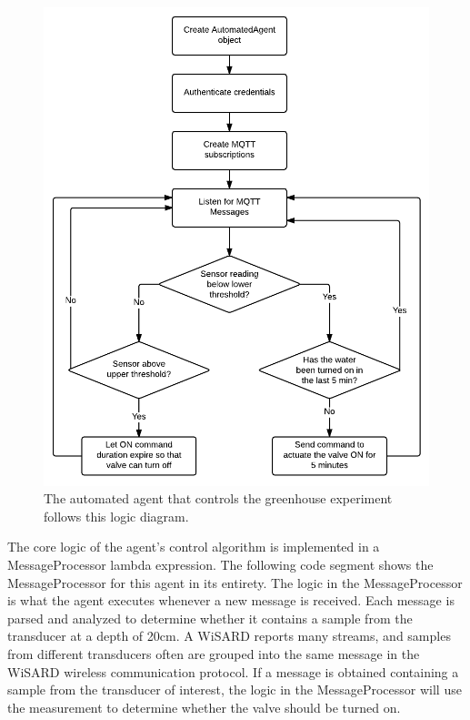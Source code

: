 \begin{figure}[H]
	\centering
	\includegraphics[width=.8\textwidth]{figures/greenhouse_agent_logic.png}
	\caption{The automated agent that controls the greenhouse experiment follows this logic diagram.}
	\label{fig:agent_logic}
\end{figure}

The core logic of the agent's control algorithm is implemented in a MessageProcessor lambda expression. The following code segment shows the MessageProcessor for this agent in its entirety. The logic in the MessageProcessor is what the agent executes whenever a new message is received. Each message is parsed and analyzed to determine whether it contains a sample from the transducer at a depth of 20cm. A WiSARD reports many streams, and samples from different transducers often are grouped into the same message in the WiSARD wireless communication protocol. If a message is obtained containing a sample from the transducer of interest, the logic in the MessageProcessor will use the measurement to determine whether the valve should be turned on.



